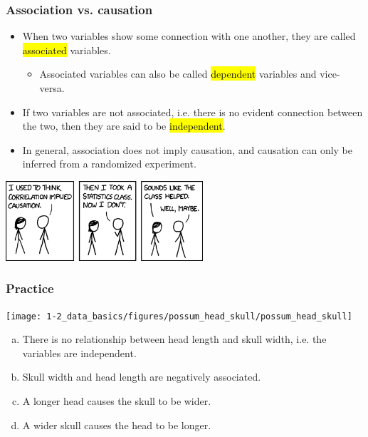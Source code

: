 
\begin{frame}
\frametitle{Association vs. causation}

\begin{itemize}

\item When two variables show some connection with one another, they are called \hl{associated} variables.
\begin{itemize}
\item Associated variables can also be called \hl{dependent} variables and vice-versa.
\end{itemize}

\item If two variables are not associated, i.e. there is no evident connection between the two, then they are said to be \hl{independent}.

\item In general, association does not imply causation, and causation can only be inferred from a randomized experiment.

\end{itemize}

\begin{center}
\includegraphics[width=0.55\textwidth]{1-2_data_basics/figures/xkcd_correlation} \\
{\tiny {}}
\end{center}

\end{frame}


\begin{frame}
\frametitle{Practice}

{
}
{
\texttt{[image: 1-2\_data\_basics/figures/possum\_head\_skull/possum\_head\_skull]}
}

\begin{enumerate}[(a)]
\item There is no relationship between head length and skull width, i.e. the variables are independent.
\item Skull width and head length are negatively associated.
\item A longer head causes the skull to be wider.
\item A wider skull causes the head to be longer.
\end{enumerate}

\end{frame}


